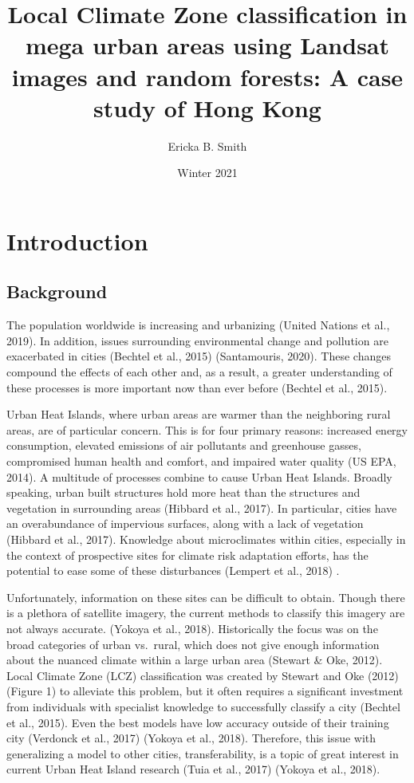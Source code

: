 \documentclass[
]{article}
\title{Local Climate Zone classification in mega urban areas using
Landsat images and random forests: A case study of Hong Kong}
\author{Ericka B. Smith}
\date{Winter 2021}
\begin{document}
\maketitle

\hypertarget{introduction}{%
\section{Introduction}\label{introduction}}

\hypertarget{background}{%
\subsection{Background}\label{background}}

The population worldwide is increasing and urbanizing (United Nations et
al., 2019). In addition, issues surrounding environmental change and
pollution are exacerbated in cities (Bechtel et al., 2015) (Santamouris,
2020). These changes compound the effects of each other and, as a
result, a greater understanding of these processes is more important now
than ever before (Bechtel et al., 2015).

Urban Heat Islands, where urban areas are warmer than the neighboring
rural areas, are of particular concern. This is for four primary
reasons: increased energy consumption, elevated emissions of air
pollutants and greenhouse gasses, compromised human health and comfort,
and impaired water quality (US EPA, 2014). A multitude of processes
combine to cause Urban Heat Islands. Broadly speaking, urban built
structures hold more heat than the structures and vegetation in
surrounding areas (Hibbard et al., 2017). In particular, cities have an
overabundance of impervious surfaces, along with a lack of vegetation
(Hibbard et al., 2017). Knowledge about microclimates within cities,
especially in the context of prospective sites for climate risk
adaptation efforts, has the potential to ease some of these disturbances
(Lempert et al., 2018) .

Unfortunately, information on these sites can be difficult to obtain.
Though there is a plethora of satellite imagery, the current methods to
classify this imagery are not always accurate. (Yokoya et al., 2018).
Historically the focus was on the broad categories of urban vs.~rural,
which does not give enough information about the nuanced climate within
a large urban area (Stewart \& Oke, 2012). Local Climate Zone (LCZ)
classification was created by Stewart and Oke (2012) (Figure 1) to
alleviate this problem, but it often requires a significant investment
from individuals with specialist knowledge to successfully classify a
city (Bechtel et al., 2015). Even the best models have low accuracy
outside of their training city (Verdonck et al., 2017) (Yokoya et al.,
2018). Therefore, this issue with generalizing a model to other cities,
transferability, is a topic of great interest in current Urban Heat
Island research (Tuia et al., 2017) (Yokoya et al., 2018).
\end{document}
